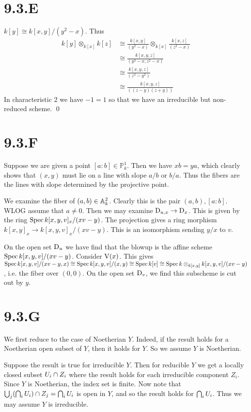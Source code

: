 \documentclass{article}
\begin{document}
\section{9.3.E}
$k[y] \cong k[x, y]/(y^2-x)$. Thus
\begin{align*}
    k[y] \otimes_{k[x]} k[z] & \cong \frac{k[x,y]}{(y^2-x)} \otimes_{k[x]} \frac{k[x,z]}{(z^2-x)} \\
                             & \cong \frac{k[x,y,z]}{(y^2-x, z^2-x)}                              \\
                             & \cong \frac{k[x,y,z]}{(z^2-y^2)}                                   \\
                             & \cong \frac{k[x,y,z]}{((z-y)(z+y))}
\end{align*}
In characteristic 2 we have $-1=1$ so that we have an
irreducible but non-reduced scheme. \qed

\section{9.3.F}
Suppose we are given a point $[a : b] \in \mathbb{P}^1_k$. Then we have
$xb=ya$, which clearly shows that $(x, y)$ must
lie on a line with slope $a/b$ or $b/a$. Thus
the fibers are the lines with slope determined by the projective point.

We examine the fiber of $(a, b) \in \mathbb{A}^2_k$. Clearly this is the pair
$(a,b), [a : b]$. WLOG assume that $a \neq 0$. Then we may
examine $\operatorname{D}_{u, x} \to \operatorname{D}_x$. This is given by the ring
$\operatorname{Spec} k[x, y, v]_x/(xv-y)$. The projection gives a ring morphism
$k[x, y]_x \to k[x, y, v]_x/(xv-y)$. This is an isomorphism sending $y/x$
to $v$.

On the open set $\operatorname{D}_u$ we have find that the blowup is the
affine scheme $\operatorname{Spec} k[x, y, v]/(xv-y)$. Consider $\operatorname{V}(x)$. This
gives $\operatorname{Spec} k[x, y, v]/(xv-y,x) \cong \operatorname{Spec}
    k[x, y, v]/(x, y) \cong \operatorname{Spec}
    k[v] \cong \operatorname{Spec} k \otimes_{k[x, y]}
    k[x,y,v]/(xv-y)$, i.e. the fiber over $(0, 0)$. On
the open set $\operatorname{D}_v$, we find this subscheme is cut out by
$y$.

\section{9.3.G}
We first reduce to the case of Noetherian $Y$. Indeed, if
the result holds for a Noetherian open subset of $Y$, then
it holds for $Y$. So we assume $Y$ is
Noetherian.

Suppose the result is true for irreducible $Y$. Then for
reducible $Y$ we get a locally closed subset
$U_i \cap Z_i$ where the result holds for each irreducible component
$Z_i$. Since $Y$ is Noetherian, the index
set is finite. Now note that $\bigcup_j (\bigcap_i U_i) \cap Z_j = \bigcap_i U_i$ is open in
$Y$, and so the result holds for $\bigcap_i U_i$.
Thus we may assume $Y$ is irreducible.
\end{document}
